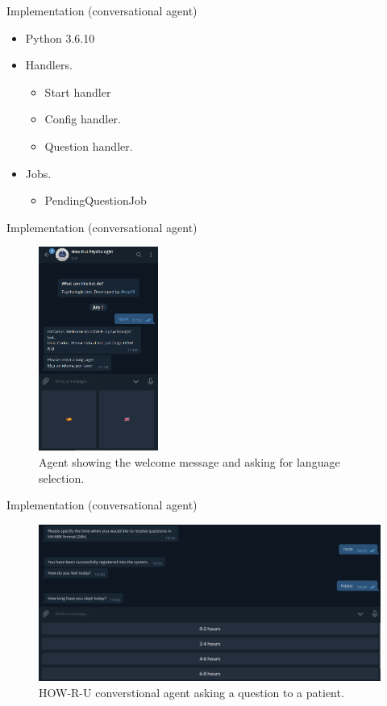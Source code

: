 \documentclass{beamer}
\begin{document}
\begin{frame}[fragile]{Implementation (conversational agent)}
  \begin{itemize}[<+->]
    \item Python 3.6.10 \cite{python}
    \item Handlers.
          \begin{itemize}[<+->]
            \item Start handler
            \item Config handler.
            \item Question handler.
          \end{itemize}
        \item Jobs.
          \begin{itemize}[<+->]
            \item PendingQuestionJob
          \end{itemize}
  \end{itemize}
\end{frame}

\begin{frame}[fragile]{Implementation (conversational agent)}
  \begin{figure}[H]
    \centering
      \includegraphics[width=0.35\textwidth]{start.png}
      \caption{Agent showing the welcome message and asking for language selection.}
  \end{figure}
\end{frame}
\begin{frame}[fragile]{Implementation (conversational agent)}
  \begin{figure}[H]
    \centering
      \includegraphics[width=\textwidth]{bot_answering.png}
    \caption{HOW-R-U converstional agent asking a question to a patient.}
  \end{figure}
\end{frame}
\end{document}
